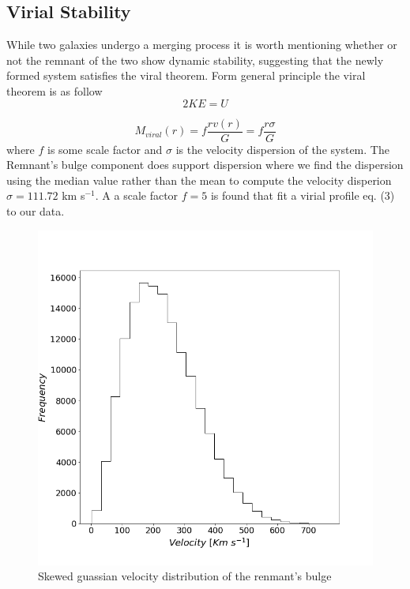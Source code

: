 \documentclass[iop]{emulateapj}
\begin{document}
\subsection{Virial Stability}
While two galaxies undergo a merging process it is worth mentioning whether or not the remnant of the two show dynamic stability, suggesting that the newly formed system satisfies the viral theorem. Form general principle the viral theorem is as follow
  \begin{equation}
  2KE = U
  \end{equation}

  \begin{equation}
  M_{viral}(r)=f\frac{rv(r)}{G} = f\frac{r\sigma}{G}
  \end{equation}
where $f$ is some scale factor and $\sigma$ is the velocity dispersion of the system. The Remnant's bulge component does support dispersion where we find the dispersion using the median value rather than the mean to compute the velocity disperion $\sigma=111.72$ km s$^{-1}$. A a scale factor $f=5$ is found that fit a virial profile eq. (3) to our data. 

  \begin{figure}[h]
    \centering
    \includegraphics[width=\columnwidth]{dispersion.png}
    \caption{Skewed guassian velocity distribution of the renmant's bulge}
  \end{figure}
  
\end{document}
